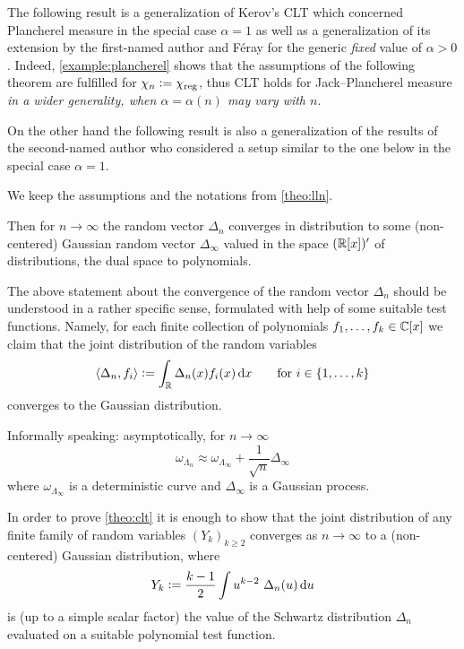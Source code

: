 \documentclass[12pt,usenames,dvipsnames,svgnames,table]{amsart}
\begin{document}
The following result is a generalization of Kerov's CLT 
\cite{Kerov1993gaussian,IvanovOlshanski2002} 
which concerned Plancherel measure in the special case $\alpha=1$
as well as a generalization of its extension by the first-named author and F\'eray \cite{DolegaFeray2014}
for the generic \emph{fixed} value of $\alpha>0$.
Indeed, \cref{example:plancherel} shows that the assumptions of the
following theorem are fulfilled for $\chi_n:=\chi_{\operatorname{reg}}$,
thus CLT holds for Jack--Plancherel measure \emph{in a wider generality, when
	$\alpha=\alpha(n)$ may vary with $n$}.

On the other hand the following result is also a generalization of the results of the second-named author
\cite{Sniady2006c} who considered a setup similar to the one below in the special case $\alpha=1$.

\begin{theorem}
	\label{theo:clt}
	We keep the assumptions and the notations from \cref{theo:lln}.
	
	Then for $n\to\infty$ the random vector
	${\Delta}_n$ converges in distribution to some (non-centered) Gaussian random vector $\Delta_\infty$
	valued in the space $(\mathbb{R}[x])'$ of distributions, the dual space to polynomials.
\end{theorem}

The above statement about the convergence of the random vector ${\Delta}_n$
	should be understood in a rather specific sense, 
	formulated with help of some suitable test functions. Namely, for each finite collection of polynomials $f_1,\dots,f_k \in \mathbb{C}[x]$ we claim that the joint distribution of the random variables
\[ \langle \Delta_n,f_i \rangle := \int_\R \Delta_n(x)f_i(x) \dif x \qquad \text{for }i\in\{1,\dots,k\} \]
converges to the Gaussian distribution.

Informally speaking: asymptotically, for $n\to\infty$
\[ \omega_{\Lambda_n} \approx \omega_{\Lambda_\infty}+\frac{1}{\sqrt{n}} \Delta_\infty 
\]
where $\omega_{\Lambda_\infty}$ is a deterministic curve and $\Delta_\infty$
is a Gaussian process.

\begin{remark}
	\label{remark:theo:clt} 
	In order to prove \cref{theo:clt} 
	it is enough to show that
	the joint distribution of any finite family of random variables
	$(Y_k)_{k\geq 2}$ converges as $n\to\infty$ to a (non-centered) Gaussian distribution, where
	\begin{equation}
	\label{eq:my-random-variables-2}   
	Y_k:= \frac{k-1}{2} \int  u^{k-2} \ \Delta_n(u) \dif u  
	\end{equation}
	is (up to a simple scalar factor)
	the value of the Schwartz distribution $\Delta_n$ evaluated on a suitable
	polynomial test function.
\end{remark}
\end{document}
